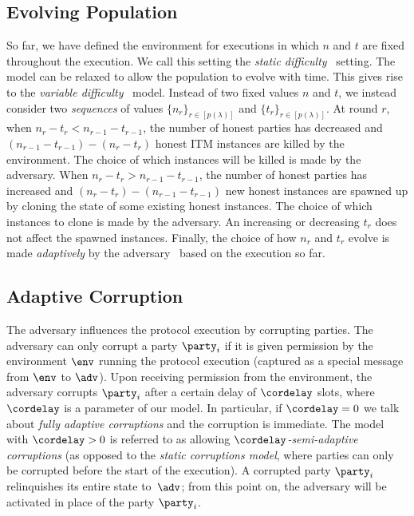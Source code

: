 \subsection{Evolving Population}
So far, we have defined the environment for executions in which $n$ and $t$ are
fixed throughout the execution. We call this setting the
\emph{static difficulty}~\cite{backbone,backbone-new}
setting. The model can be relaxed to allow the population to evolve with time.
This gives rise to the
\emph{variable difficulty}~\cite{varbackbone}
model.
Instead of two fixed values $n$ and $t$, we instead consider two
\emph{sequences} of values
$\{n_r\}_{r \in [p(\lambda)]}$ and $\{t_r\}_{r \in [p(\lambda)]}$.
At round $r$, when $n_r - t_r < n_{r-1} - t_{r-1}$, the number of honest
parties has decreased and $(n_{r-1} - t_{r-1}) - (n_r - t_r)$ honest ITM
instances are killed by the environment. The choice of which instances will be
killed is made by the adversary. When
$n_r - t_r > n_{r-1} - t_{r-1}$, the number of honest parties has increased and
$(n_r - t_r) - (n_{r-1} - t_{r-1})$ new honest instances are spawned up by
cloning the state of some existing honest instances. The choice of which
instances to clone is made by the adversary. An increasing or decreasing $t_r$
does not affect the spawned instances. Finally, the choice of how $n_r$
and $t_r$ evolve is made \emph{adaptively} by the adversary~\cite{variable-new}
based on the execution so far.



\subsection{Adaptive Corruption}
\label{sec:prelim-corr}

The adversary influences the protocol execution by corrupting parties.
The adversary can only corrupt a party $\party_i$ if it is given
permission by the environment $\env$ running the protocol execution (captured as
a special message from $\env$ to $\adv$).
Upon receiving permission from the environment, the adversary
corrupts $\party_i$ after a certain delay of $\cordelay$ slots, where $\cordelay$ is
a parameter of our model. In particular, if $\cordelay=0$ we talk about
\emph{fully adaptive corruptions} and the corruption is immediate.
The model with $\cordelay>0$ is
referred to as allowing \emph{$\cordelay$-semi-adaptive corruptions} (as opposed to the
\emph{static corruptions model}, where parties can only be corrupted before the
start of the execution).
%
A corrupted
party $\party_i$ relinquishes its entire state to~$\adv$;
from this point on, the adversary will be activated in place of the
party $\party_i$.
